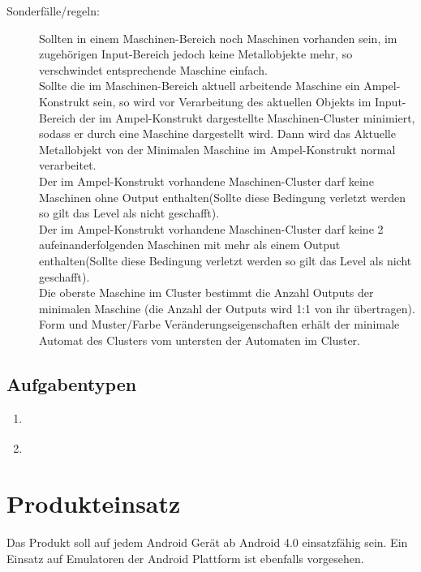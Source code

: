\documentclass{scrartcl}
\begin{document}
\begin{description}
	\item[Sonderfälle/regeln:] Sollten in einem Maschinen-Bereich noch Maschinen vorhanden sein, im zugehörigen Input-Bereich jedoch keine Metallobjekte mehr, so verschwindet entsprechende Maschine einfach.\\
	Sollte die im Maschinen-Bereich aktuell arbeitende Maschine ein Ampel-Konstrukt sein, so wird vor Verarbeitung des aktuellen Objekts im Input-Bereich der im Ampel-Konstrukt dargestellte Maschinen-Cluster minimiert, sodass er durch eine Maschine dargestellt wird. Dann wird das Aktuelle Metallobjekt von der Minimalen Maschine im Ampel-Konstrukt normal verarbeitet.\\
	Der im Ampel-Konstrukt vorhandene Maschinen-Cluster darf keine Maschinen ohne Output enthalten(Sollte diese Bedingung verletzt werden so gilt das Level als nicht geschafft).\\
	Der im Ampel-Konstrukt vorhandene Maschinen-Cluster darf keine 2 aufeinanderfolgenden Maschinen mit mehr als einem Output enthalten(Sollte diese Bedingung verletzt werden so gilt das Level als nicht geschafft).\\
	Die oberste Maschine im Cluster bestimmt die Anzahl Outputs der minimalen Maschine (die Anzahl der Outputs wird 1:1 von ihr übertragen). Form und Muster/Farbe Veränderungseigenschaften erhält der minimale Automat des Clusters vom untersten der Automaten im Cluster.
\end{description}

\subsection{Aufgabentypen}

\begin{enumerate}
	\item \label{aufgabentyp:puzzle}
	\item \label{aufgabentyp:fehlerfindung}
\end{enumerate}

\clearpage









\section{Produkteinsatz}

Das Produkt soll auf jedem Android Gerät ab Android 4.0 einsatzfähig sein. Ein Einsatz auf Emulatoren der Android Plattform ist ebenfalls vorgesehen.
\end{document}
